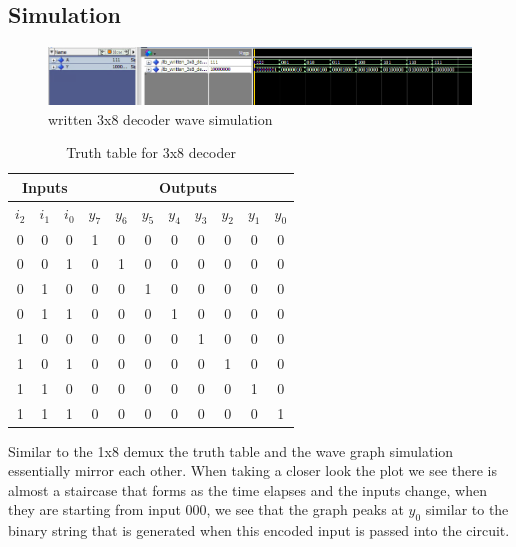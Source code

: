 \documentclass[12pt]{article}
\begin{document}
\subsection{Simulation}
\begin{figure}[h]
\caption{written 3x8 decoder wave simulation}
\centering
\includegraphics[width=\textwidth]{./diagrams/written_3x8_decoder_simulation.png}
\end{figure}

\begin{table}[h]
    \begin{tabular}{|c|c|c||c|c|c|c|c|c|c|c|}
        \hline
        \multicolumn{3}{|c||}{Inputs} & \multicolumn{8}{c|}{Outputs} \\
        \hline
        \( i_2 \) & \( i_1 \) & \( i_0 \) & \( y_7 \) & \( y_6 \) & \( y_5 \) & \( y_4 \) & \( y_3 \) & \( y_2 \) & \( y_1 \) & \( y_0 \) \\
        \hline
        0 & 0 & 0 & 1 & 0 & 0 & 0 & 0 & 0 & 0 & 0 \\
        \hline
        0 & 0 & 1 & 0 & 1 & 0 & 0 & 0 & 0 & 0 & 0 \\
        \hline
        0 & 1 & 0  & 0 & 0 & 1 & 0 & 0 & 0 & 0 & 0 \\
        \hline
        0 & 1 & 1  & 0 & 0 & 0 & 1 & 0 & 0 & 0 & 0 \\
        \hline
        1 & 0 & 0  & 0 & 0 & 0 & 0 & 1 & 0 & 0 & 0 \\
        \hline
        1 & 0 & 1  & 0 & 0 & 0 & 0 & 0 & 1 & 0 & 0 \\
        \hline
        1 & 1 & 0  & 0 & 0 & 0 & 0 & 0 & 0 & 1 & 0 \\
        \hline
        1 & 1 & 1  & 0 & 0 & 0 & 0 & 0 & 0 & 0 & 1 \\
        \hline
    \end{tabular}
    \caption{Truth table for 3x8 decoder}
\end{table}

\noindent Similar to the 1x8 demux the truth table and the wave graph simulation essentially mirror each other. When taking a closer look the plot we see there is almost a staircase that forms as the time elapses and the inputs change, when they are starting from input 000, we see that the graph peaks at $y_0$ similar to the binary string that is generated when this encoded input is passed into the circuit. 
\end{document}

